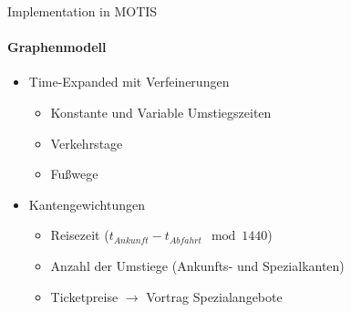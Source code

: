 \begin{frame}{Implementation in MOTIS}
	\framesubtitle{Graphenmodell}
	\begin{itemize}
		\item Time-Expanded mit Verfeinerungen
		\begin{itemize}
			\item Konstante und Variable Umstiegszeiten
			\item Verkehrstage
			\item Fußwege
		\end{itemize}
		\vspace{2em}
		\item Kantengewichtungen
		\begin{itemize}
			\item Reisezeit ($t_{Ankunft} - t_{Abfahrt} \mod 1440$)
			\item Anzahl der Umstiege (Ankunfts- und Spezialkanten)
			\item Ticketpreise $\rightarrow$ Vortrag Spezialangebote
		\end{itemize}
	\end{itemize}
\end{frame}

%


%
